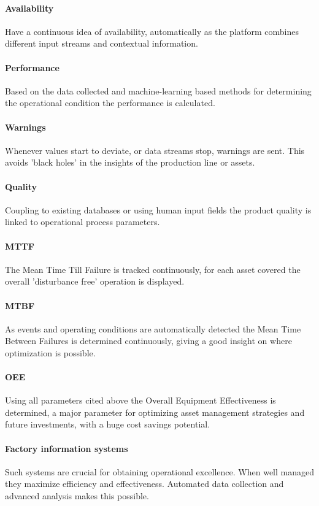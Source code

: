 \paragraph{Availability}
Have a continuous idea of availability, automatically as the platform combines different input streams and contextual information.
\paragraph{Performance}
Based on the data collected and machine-learning based methods for determining the operational condition the performance is calculated.
\paragraph{Warnings}
Whenever values start to deviate, or data streams stop, warnings are sent. This avoids 'black holes' in the insights of the production line or assets.
\paragraph{Quality}
Coupling to existing databases or using human input fields the product quality is linked to operational process parameters.
\paragraph{MTTF}
The Mean Time Till Failure is tracked continuously, for each asset covered the overall 'disturbance free' operation is displayed.
\paragraph{MTBF}
As events and operating conditions are automatically detected the Mean Time Between Failures is determined continuously, giving a good insight on where optimization is possible.
\paragraph{OEE}
Using all parameters cited above the Overall Equipment Effectiveness is determined, a major parameter for optimizing asset management strategies and future investments, with a huge cost savings potential.
\paragraph{Factory information systems}
Such systems are crucial for obtaining operational excellence. When well managed they maximize efficiency and effectiveness. Automated data collection and advanced analysis makes this possible.
